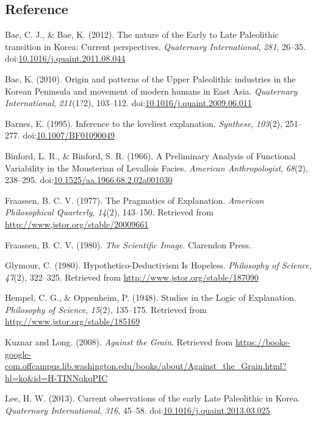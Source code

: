 \documentclass[american,man]{apa6}
\begin{document}
\subsection*{Reference}\label{reference}

Bae, C. J., \& Bae, K. (2012). The nature of the Early to Late
Paleolithic transition in Korea: Current perspectives. \emph{Quaternary
International}, \emph{281}, 26--35.
doi:\href{http://dx.doi.org/10.1016/j.quaint.2011.08.044}{10.1016/j.quaint.2011.08.044}

Bae, K. (2010). Origin and patterns of the Upper Paleolithic industries
in the Korean Peninsula and movement of modern humans in East Asia.
\emph{Quaternary International}, \emph{211}(1?2), 103--112.
doi:\href{http://dx.doi.org/10.1016/j.quaint.2009.06.011}{10.1016/j.quaint.2009.06.011}

Barnes, E. (1995). Inference to the loveliest explanation.
\emph{Synthese}, \emph{103}(2), 251--277.
doi:\href{http://dx.doi.org/10.1007/BF01090049}{10.1007/BF01090049}

Binford, L. R., \& Binford, S. R. (1966). A Preliminary Analysis of
Functional Variability in the Mousterian of Levallois Facies.
\emph{American Anthropologist}, \emph{68}(2), 238--295.
doi:\href{http://dx.doi.org/10.1525/aa.1966.68.2.02a001030}{10.1525/aa.1966.68.2.02a001030}

Fraassen, B. C. V. (1977). The Pragmatics of Explanation. \emph{American
Philosophical Quarterly}, \emph{14}(2), 143--150. Retrieved from
\url{http://www.jstor.org/stable/20009661}

Fraassen, B. C. V. (1980). \emph{The Scientific Image}. Clarendon Press.

Glymour, C. (1980). Hypothetico-Deductivism Is Hopeless.
\emph{Philosophy of Science}, \emph{47}(2), 322--325. Retrieved from
\url{http://www.jstor.org/stable/187090}

Hempel, C. G., \& Oppenheim, P. (1948). Studies in the Logic of
Explanation. \emph{Philosophy of Science}, \emph{15}(2), 135--175.
Retrieved from \url{http://www.jstor.org/stable/185169}

Kuznar and Long. (2008). \emph{Against the Grain}. Retrieved from
\url{https://books-google-com.offcampus.lib.washington.edu/books/about/Against_the_Grain.html?hl=ko\&id=H-TINNqkqPIC}

Lee, H. W. (2013). Current observations of the early Late Paleolithic in
Korea. \emph{Quaternary International}, \emph{316}, 45--58.
doi:\href{http://dx.doi.org/10.1016/j.quaint.2013.03.025}{10.1016/j.quaint.2013.03.025}
\end{document}
